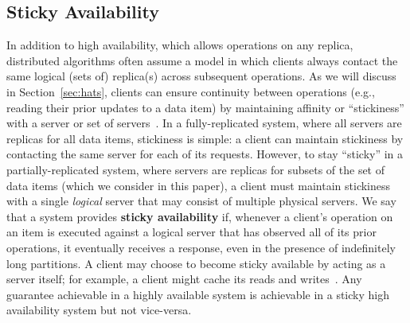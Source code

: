 \subsection{Sticky Availability}
\label{sec:sticky}

In addition to high availability, which allows operations on any
replica, distributed algorithms often assume a model in which clients
always contact the same logical (sets of) replica(s) across subsequent
operations. As we will discuss in Section~\ref{sec:hats}, clients can
ensure continuity between operations (e.g., reading their prior
updates to a data item) by maintaining affinity or ``stickiness'' with
a server or set of servers~\cite{vogels-defs}. In a fully-replicated
system, where all servers are replicas for all data items, stickiness
is simple: a client can maintain stickiness by contacting the same
server for each of its requests. However, to stay ``sticky'' in a
partially-replicated system, where servers are replicas for subsets of
the set of data items (which we consider in this paper), a client must
maintain stickiness with a single \textit{logical} server that may
consist of multiple physical servers. We say that a system provides
\textbf{sticky availability} if, whenever a client's operation on an
item is executed against a logical server that has observed all of its
prior operations, it eventually receives a response, even in the
presence of indefinitely long partitions. A client may choose to
become sticky available by acting as a server itself; for example, a
client might cache its reads and writes~\cite{bolton,
  sessionguarantees, swift}. Any guarantee achievable in a highly
available system is achievable in a sticky high availability system
but not vice-versa.


